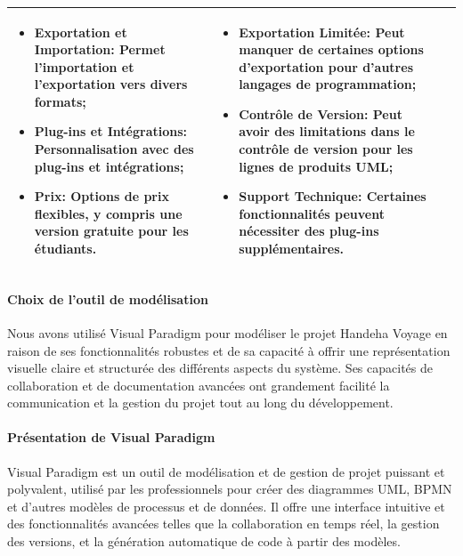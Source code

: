 \documentclass[12pt]{report}
\begin{document}
\begin{longtable}{|p{3cm}|p{5.5cm}|p{5.5cm}|}
\begin{itemize}
							\item \textbf{Exportation et Importation:} Permet l'importation et l'exportation vers divers formats;
							\item \textbf{Plug-ins et Intégrations:} Personnalisation avec des plug-ins et intégrations;
							\item \textbf{Prix:} Options de prix flexibles, y compris une version gratuite pour les étudiants.
						\end{itemize} &
						\begin{itemize}
							\item \textbf{Exportation Limitée:} Peut manquer de certaines options d'exportation pour d'autres langages de programmation;
							\item \textbf{Contrôle de Version:} Peut avoir des limitations dans le contrôle de version pour les lignes de produits UML;
							\item \textbf{Support Technique:} Certaines fonctionnalités peuvent nécessiter des plug-ins supplémentaires.
						\end{itemize}\\						
						\hline
				    \end{longtable}


				\paragraph{Choix de l'outil de modélisation}
				
				Nous avons utilisé Visual Paradigm pour modéliser le projet Handeha Voyage en raison de ses fonctionnalités robustes et de sa capacité à offrir une représentation visuelle claire et structurée des différents aspects du système. Ses capacités de collaboration et de documentation avancées ont grandement facilité la communication et la gestion du projet tout au long du développement.


				\paragraph{Présentation de Visual Paradigm}

				Visual Paradigm est un outil de modélisation et de gestion de projet puissant et polyvalent, utilisé par les professionnels pour créer des diagrammes UML, BPMN et d'autres modèles de processus et de données. Il offre une interface intuitive et des fonctionnalités avancées telles que la collaboration en temps réel, la gestion des versions, et la génération automatique de code à partir des modèles.
\end{document}
